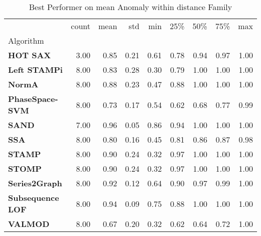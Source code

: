 \begin{table}
\caption{Best Performer on mean Anomaly within distance Family}
\label{tab:bp-mean_distance}
\begin{tabular}{lrrrrrrrr}
\toprule
 & count & mean & std & min & 25\% & 50\% & 75\% & max \\
Algorithm &  &  &  &  &  &  &  &  \\
\midrule
\textbf{HOT SAX} & 3.00 & 0.85 & 0.21 & 0.61 & 0.78 & 0.94 & 0.97 & 1.00 \\
\textbf{Left STAMPi} & 8.00 & 0.83 & 0.28 & 0.30 & 0.79 & 1.00 & 1.00 & 1.00 \\
\textbf{NormA} & 8.00 & 0.88 & 0.23 & 0.47 & 0.88 & 1.00 & 1.00 & 1.00 \\
\textbf{PhaseSpace-SVM} & 8.00 & 0.73 & 0.17 & 0.54 & 0.62 & 0.68 & 0.77 & 0.99 \\
\textbf{SAND} & 7.00 & 0.96 & 0.05 & 0.86 & 0.94 & 1.00 & 1.00 & 1.00 \\
\textbf{SSA} & 8.00 & 0.80 & 0.16 & 0.45 & 0.81 & 0.86 & 0.87 & 0.98 \\
\textbf{STAMP} & 8.00 & 0.90 & 0.24 & 0.32 & 0.97 & 1.00 & 1.00 & 1.00 \\
\textbf{STOMP} & 8.00 & 0.90 & 0.24 & 0.32 & 0.97 & 1.00 & 1.00 & 1.00 \\
\textbf{Series2Graph} & 8.00 & 0.92 & 0.12 & 0.64 & 0.90 & 0.97 & 0.99 & 1.00 \\
\textbf{Subsequence LOF} & 8.00 & 0.94 & 0.09 & 0.75 & 0.88 & 1.00 & 1.00 & 1.00 \\
\textbf{VALMOD} & 8.00 & 0.67 & 0.20 & 0.32 & 0.62 & 0.64 & 0.72 & 1.00 \\
\bottomrule
\end{tabular}
\end{table}
